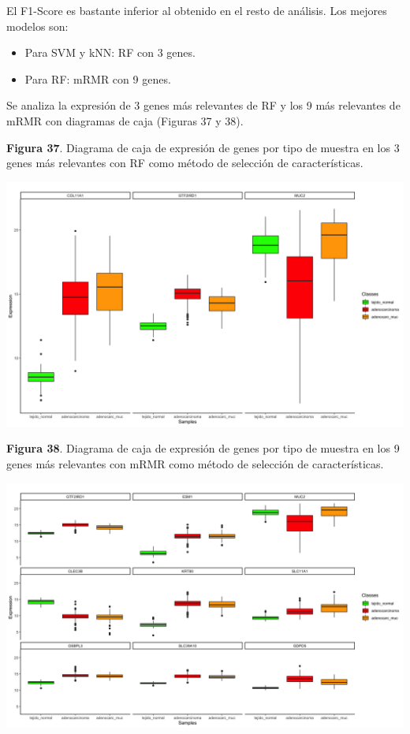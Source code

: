 El F1-Score es bastante inferior al obtenido en el resto de análisis. Los mejores modelos son:
\begin{itemize}
	\item Para SVM y kNN: RF con 3 genes.
	\item Para RF: mRMR con 9 genes.
\end{itemize}

Se analiza la expresión de 3 genes más relevantes de RF y los 9 más relevantes de mRMR con diagramas de caja (Figuras 37 y 38).

\begin{center}
	\textbf{Figura 37}. Diagrama de caja de expresión de genes por tipo de muestra en los 3 genes más relevantes con RF como método de selección de características.
\end{center}
\begin{center}
	\includegraphics[width=1\textwidth]{figuras/37_cr_multiclase_34_knn_boxplots_mejor_metodo.png} 
\end{center}

\newpage
\begin{center}
	\textbf{Figura 38}. Diagrama de caja de expresión de genes por tipo de muestra en los 9 genes más relevantes con mRMR como método de selección de características.
\end{center}
\begin{center}
	\includegraphics[width=1\textwidth]{figuras/38_cr_multiclase_24_rf_boxplots_mejor_metodo.png} 
\end{center}

